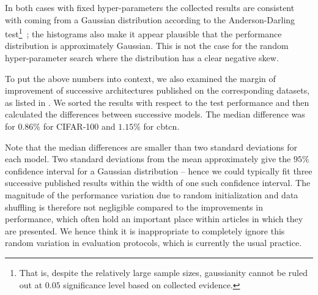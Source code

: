 \documentclass{article}
\newcommand{\asr}{\gls{psr}\xspace}
\newcommand{\cbtcn}{\gls{cbtcn}\xspace}
\begin{document}
\begin{appendices}
In both cases with fixed hyper-parameters the collected results are consistent with coming from a Gaussian distribution according to the Anderson-Darling test\footnote{That is, despite the relatively large sample sizes, gaussianity cannot be ruled out at $0.05$ significance level based on collected evidence.}~\cite{anderson1954atest}; the histograms also make it appear plausible that the performance distribution is approximately Gaussian. This is not the case for the random hyper-parameter search where the distribution has a clear negative skew. 


To put the above numbers into context, we also examined the margin of improvement of successive architectures published on the corresponding datasets, as listed in \cite{munkhdalai2016reasoning, huang2016densely}. We sorted the results with respect to the test performance and then calculated the differences between successive models. The median difference was for $0.86\%$ for CIFAR-100 and $1.15\%$ for \cbtcn. 

Note that the median differences are smaller than two standard deviations for each model. Two standard deviations from the mean approximately give the $95\%$ confidence interval for a Gaussian distribution -- hence we could typically fit three successive published results within the width of one such confidence interval. The magnitude of the performance variation due to random initialization and data shuffling is therefore not negligible compared to the improvements in performance, which often hold an important place within articles in which they are presented. We hence think it is inappropriate to completely ignore this random variation in evaluation protocols, which is currently the usual practice. 



\end{appendices}
\end{document}
